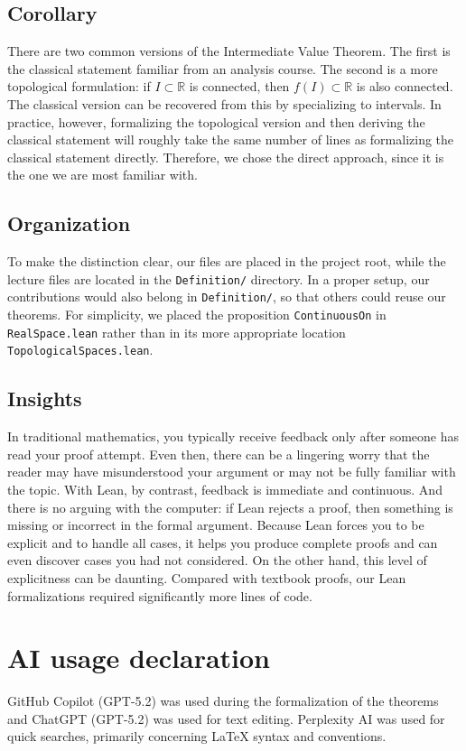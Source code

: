 \documentclass[11pt, oneside]{article}
\theoremstyle{plain}
\theoremstyle{definition}
\newcommand{\R}{\mathbb{R}}
\begin{document}
\subsection{Corollary}

There are two common versions of the Intermediate Value Theorem. The first is the classical statement familiar from an analysis course. The second is a more topological formulation: if $I \subset \R$ is connected, then $f(I) \subset \R$ is also connected. The classical version can be recovered from this by specializing to intervals.
In practice, however, formalizing the topological version and then deriving the classical statement will roughly take the same number of lines as formalizing the classical statement directly. Therefore, we chose the direct approach, since it is the one we are most familiar with.

\subsection{Organization}
To make the distinction clear, our files are placed in the project root, while the lecture files are located in the \verb|Definition/| directory. In a proper setup, our contributions would also belong in \verb|Definition/|, so that others could reuse our theorems.
For simplicity, we placed the proposition \verb|ContinuousOn| in \verb|RealSpace.lean| rather than in its more appropriate location \\
\verb|TopologicalSpaces.lean|.

\subsection{Insights}
In traditional mathematics, you typically receive feedback only after someone has read your proof attempt. Even then, there can be a lingering worry that the reader may have misunderstood your argument or may not be fully familiar with the topic.
With Lean, by contrast, feedback is immediate and continuous. And there is no arguing with the computer: if Lean rejects a proof, then something is missing or incorrect in the formal argument.
Because Lean forces you to be explicit and to handle all cases, it helps you produce complete proofs and can even discover cases you had not considered.
On the other hand, this level of explicitness can be daunting. Compared with textbook proofs, our Lean formalizations required significantly more lines of code.

\printbibliography

\section*{AI usage declaration}
GitHub Copilot (GPT-5.2) was used during the formalization of the theorems and ChatGPT (GPT-5.2) was used for text editing. Perplexity AI was used for quick searches, primarily concerning LaTeX syntax and conventions.
\end{document}
